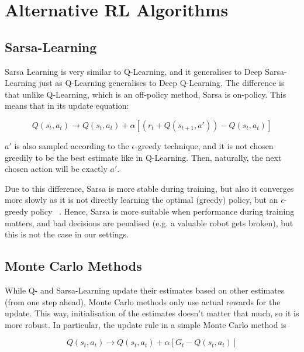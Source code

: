 \chapter{Alternative RL Algorithms}\label{alternativeRL} 



\section{Sarsa-Learning}

Sarsa Learning is very similar to Q-Learning, and it generalises to Deep Sarsa-Learning just as Q-Learning generalises to Deep Q-Learning. The difference is that unlike Q-Learning, which is an off-policy method, Sarsa is on-policy. This means that in its update equation:

\begin{equation} \label{eq:sarsa-learningUpdate}
Q(s_t,a_t) \longrightarrow Q(s_t,a_t) + \alpha[( r_t + Q(s_{t+1}, a')) - Q(s_t,a_t)]
\end{equation}

$a'$ is also sampled according to the $\epsilon$-greedy technique, and it is not chosen greedily to be the best estimate like in Q-Learning. Then, naturally, the next chosen action will be exactly $a'$.

Due to this difference, Sarsa is more stable during training, but also it converges more slowly as it is not directly learning the optimal (greedy) policy, but an $\epsilon$-greedy policy ~\cite{sutton2018RLbook}. Hence, Sarsa is more suitable when performance during training matters, and bad decisions are penalised (e.g. a valuable robot gets broken), but this is not the case in our settings.

\section{Monte Carlo Methods}


While Q- and Sarsa-Learning update their estimates based on other estimates (from one step ahead), Monte Carlo methods only use actual rewards for the update. This way, initialisation of the estimates doesn't matter that much, so it is more robust. In particular, the update rule in a simple Monte Carlo method is

\begin{equation} \label{eq:monte-carloUpdate}
Q(s_t,a_t) \longrightarrow Q(s_t,a_t) + \alpha[G_t - Q(s_t,a_t)]
\end{equation}

